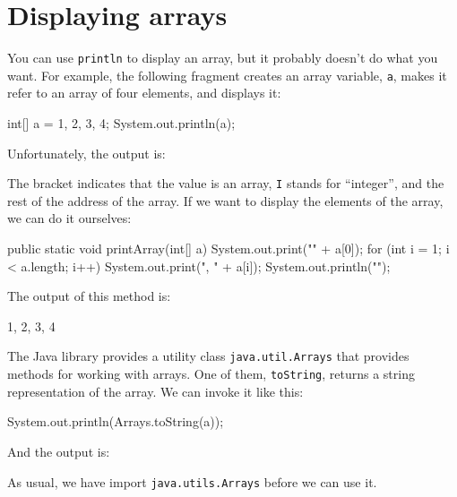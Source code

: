 \documentclass[12pt]{book}
\theoremstyle{exercise}
\newcommand{\java}[1]{\verb"#1"}
\begin{document}
\section{Displaying arrays}
\label{printarray}

You can use \java{println} to display an array, but it probably doesn't do what you want.
For example, the following fragment creates an array variable, \java{a}, makes it refer to an array of four elements, and displays it:

\begin{code}
    int[] a = {1, 2, 3, 4};
    System.out.println(a);
\end{code}

Unfortunately, the output is:

\begin{stdout}
[I@bf3f7e0
\end{stdout}

The bracket indicates that the value is an array, \java{I} stands for ``integer'', and the rest of the address of the array.
If we want to display the elements of the array, we can do it ourselves:

\begin{code}
    public static void printArray(int[] a) {
        System.out.print("{" + a[0]);
        for (int i = 1; i < a.length; i++) {
            System.out.print(", " + a[i]);
        }
        System.out.println("}");
    }
\end{code}

The output of this method is:

\begin{stdout}
{1, 2, 3, 4}
\end{stdout}


The Java library provides a utility class \java{java.util.Arrays} that provides methods for working with arrays.
One of them, \java{toString}, returns a string representation of the array.
We can invoke it like this:

\begin{code}
    System.out.println(Arrays.toString(a));
\end{code}

And the output is:

\begin{stdout}
[1, 2, 3, 4]
\end{stdout}

As usual, we have import \java{java.utils.Arrays} before we can use it.
\end{document}
